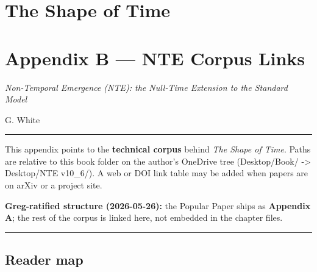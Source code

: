 \documentclass[
  11pt,
]{article}
\author{}
\date{}
\begin{document}
\section{The Shape of Time}\label{the-shape-of-time}

\section{Appendix B --- NTE Corpus
Links}\label{appendix-b-nte-corpus-links}

\emph{Non-Temporal Emergence (NTE): the Null-Time Extension to the
Standard Model}

G. White

\begin{center}\rule{0.5\linewidth}{0.5pt}\end{center}

This appendix points to the \textbf{technical corpus} behind \emph{The
Shape of Time}. Paths are relative to this book folder on the author's
OneDrive tree (Desktop/Book/ -\textgreater{} Desktop/NTE v10\_6/). A web
or DOI link table may be added when papers are on arXiv or a project
site.

\textbf{Greg-ratified structure (2026-05-26):} the Popular Paper ships
as \textbf{Appendix A}; the rest of the corpus is linked here, not
embedded in the chapter files.

\begin{center}\rule{0.5\linewidth}{0.5pt}\end{center}

\subsection{Reader map}\label{reader-map}
\end{document}
